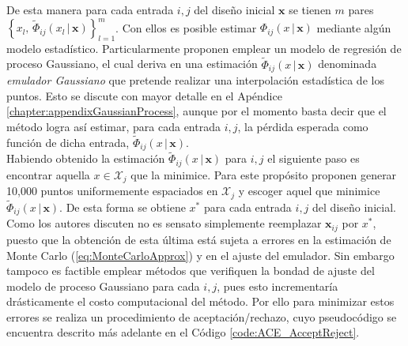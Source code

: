 De esta manera para cada entrada $i,j$ del diseño inicial $\mathbf{x}$ se tienen $m$ pares $\left\{ x_l, \, \tilde{\Phi}_{ij}(x_l \, | \, \mathbf{x} ) \right\}_{l=1}^{m}$. Con ellos es posible estimar $\Phi_{ij}(x \, | \, \mathbf{x} )$ mediante algún modelo estadístico. Particularmente \cite{Woods_ACE} proponen emplear un modelo de regresión de proceso Gaussiano, el cual deriva en una estimación $\tilde{\Phi}_{ij}(x \, | \, \mathbf{x} )$ denominada \textit{emulador Gaussiano} que pretende realizar una interpolación estadística de los puntos. Esto se discute con mayor detalle en el Apéndice \ref{chapter:appendixGaussianProcess}, aunque por el momento basta decir que el método logra así estimar, para cada entrada $i,j$, la pérdida esperada como función de dicha entrada, $\tilde{\Phi}_{ij}(x \, | \, \mathbf{x} )$. \\



Habiendo obtenido la estimación $\tilde{\Phi}_{ij}(x \, | \, \mathbf{x} )$ para $i,j$ el siguiente paso es encontrar aquella $x \in \mathcal{X}_j$ que la minimice. Para este propósito \cite{Woods_ACE} proponen generar 10,000 puntos uniformemente espaciados en $\mathcal{X}_j$ y escoger aquel que minimice $\tilde{\Phi}_{ij}(x \, | \, \mathbf{x} )$. De esta forma se obtiene $x^{*}$ para cada entrada $i,j$ del diseño inicial. \\



Como los autores discuten no es sensato simplemente reemplazar $\mathbf{x}_{ij}$ por $x^{*}$, puesto que la obtención de esta última está sujeta a errores en la estimación de Monte Carlo (\ref{eq:MonteCarloApprox}) y en el ajuste del emulador. Sin embargo tampoco es factible emplear métodos que verifiquen la bondad de ajuste del modelo de proceso Gaussiano para cada $i,j$, pues esto incrementaría drásticamente el costo computacional del método. Por ello para minimizar estos errores se realiza un procedimiento de aceptación/rechazo, cuyo pseudocódigo se encuentra descrito más adelante en el Código \ref{code:ACE_AcceptReject}. \\


